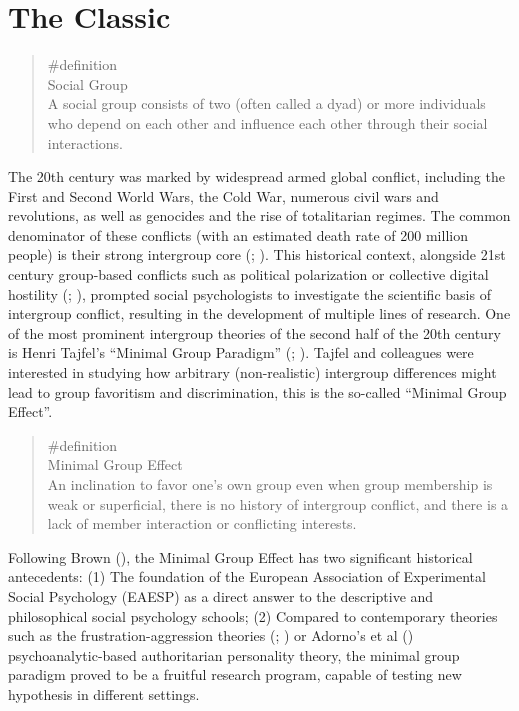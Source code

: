\documentclass[
  letterpaper,
]{book}
\begin{document}
\section{The Classic}\label{the-classic-16}

\begin{quote}
\label{def-socialgroup}{\#definition}\\
Social Group\\
A social group consists of two (often called a dyad) or more individuals
who depend on each other and influence each other through their social
interactions.
\end{quote}

The 20th century was marked by widespread armed global conflict,
including the First and Second World Wars, the Cold War, numerous civil
wars and revolutions, as well as genocides and the rise of totalitarian
regimes. The common denominator of these conflicts (with an estimated
death rate of 200 million people) is their strong intergroup core
(;
). This historical
context, alongside 21st century group-based conflicts such as political
polarization or collective digital hostility
(;
), prompted social
psychologists to investigate the scientific basis of intergroup
conflict, resulting in the development of multiple lines of research.
One of the most prominent intergroup theories of the second half of the
20th century is Henri Tajfel's ``Minimal Group Paradigm''
(;
). Tajfel and
colleagues were interested in studying how arbitrary (non-realistic)
intergroup differences might lead to group favoritism and
discrimination, this is the so-called ``Minimal Group Effect''.

\begin{quote}
\label{def-minimalgroupeffect}{\#definition}\\
Minimal Group Effect\\
An inclination to favor one's own group even when group membership is
weak or superficial, there is no history of intergroup conflict, and
there is a lack of member interaction or conflicting interests.
\end{quote}

Following Brown (), the Minimal
Group Effect has two significant historical antecedents: (1) The
foundation of the European Association of Experimental Social Psychology
(EAESP) as a direct answer to the descriptive and philosophical social
psychology schools; (2) Compared to contemporary theories such as the
frustration-aggression theories
(;
) or Adorno's
et al ()
psychoanalytic-based authoritarian personality theory, the minimal group
paradigm proved to be a fruitful research program, capable of testing
new hypothesis in different settings.
\end{document}
